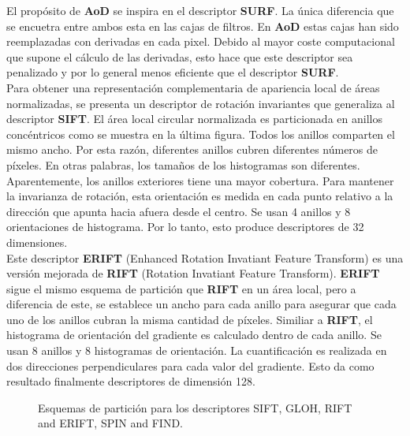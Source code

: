El propósito de \textbf{AoD} se inspira en el descriptor \textbf{SURF}. La única diferencia que se encuetra entre ambos esta en las cajas de filtros. En \textbf{AoD} estas cajas han sido reemplazadas con derivadas en cada pixel. Debido al mayor coste computacional que supone el cálculo de las derivadas, esto hace que este descriptor sea penalizado y por lo general menos eficiente que el descriptor \textbf{SURF}.  \\

Para obtener una representación complementaria de apariencia local de áreas normalizadas, se presenta un descriptor de rotación invariantes que generaliza al descriptor \textbf{SIFT}. El área local circular normalizada es particionada en anillos concéntricos como se muestra en la última figura. Todos los anillos comparten el mismo ancho. Por esta razón, diferentes anillos cubren diferentes números de píxeles. En otras palabras, los tamaños de los histogramas son diferentes. Aparentemente, los anillos exteriores tiene una mayor cobertura. Para mantener la invarianza de rotación, esta orientación es medida en cada punto relativo a la dirección que apunta hacia afuera desde el centro. Se usan 4 anillos y 8 orientaciones de histograma. Por lo tanto, esto produce descriptores de 32 dimensiones. \\

Este descriptor \textbf{ERIFT} (Enhanced Rotation Invatiant Feature Transform) es una versión mejorada de \textbf{RIFT} (Rotation Invatiant Feature Transform). \textbf{ERIFT} sigue el mismo esquema de partición que \textbf{RIFT} en un área local, pero a diferencia de este, se establece un ancho para cada anillo para asegurar que cada uno de los anillos cubran la misma cantidad de píxeles. Similiar a \textbf{RIFT}, el histograma de orientación del gradiente es calculado dentro de cada anillo. Se usan 8 anillos y 8 histogramas de orientación. La cuantificación es realizada en dos direcciones perpendiculares para cada valor del gradiente. Esto da como resultado finalmente descriptores de dimensión 128. \\

\begin{figure}[htbp]
\centering
{}
\caption{Esquemas de partición para los descriptores SIFT, GLOH, RIFT and ERIFT, SPIN and FIND.} \label{fig:señales}
\end{figure}



